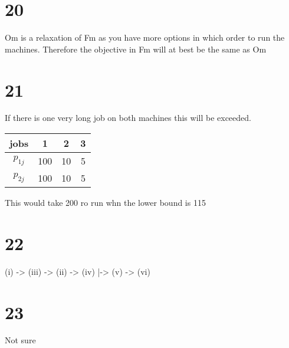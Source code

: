 \documentclass[11pt]{article}
\begin{document}
\section*{20}

Om is a relaxation of Fm as you have more options in which order to run the machines.
Therefore the objective in Fm will at best be the same as Om

\section*{21}
If there is one very long job on both machines this will be exceeded.
\begin{center}
\begin{tabular}{ c c c c}
     jobs & 1 & 2 & 3 \\
     \hline
     $p_{1j}$ & 100 & 10 & 5 \\
     $p_{2j}$ & 100 & 10 & 5
\end{tabular}
\end{center}

This would take 200 ro run whn the lower bound is 115


\section*{22}
(i) -> (iii) -> (ii) -> (iv)
        |-> (v) -> (vi)

\section*{23}
Not sure
\end{document}
